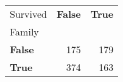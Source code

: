 \begin{tabular}{lrr}
\toprule
Survived & \textbf{False} & \textbf{True} \\
Family &  &  \\
\midrule
\textbf{False} & 175 & 179 \\
\textbf{True} & 374 & 163 \\
\bottomrule
\end{tabular}
